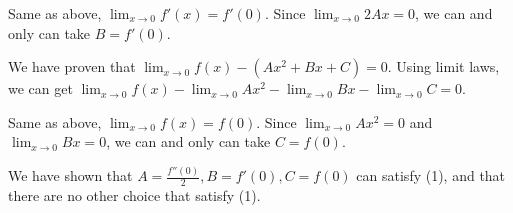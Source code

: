 \documentclass[12pt]{exam}
\newcommand{\R}{\mathbb{R}}
\begin{document}
\begin{enumerate}
\begin{enumerate}
			Same as above, $\lim_{x \to 0} f'(x) = f'(0)$. Since $\lim_{x \to 0} 2Ax = 0$, 
			we can and only can take $B = f'(0)$.

			We have proven that $\lim_{x \to 0} f(x) - (Ax^2 + Bx + C) = 0$.
			Using limit laws, we can get $\lim_{x \to 0} f(x) - \lim_{x \to 0}Ax^2 - \lim_{x \to 0}Bx - \lim_{x \to 0}C = 0$.

			Same as above, $\lim_{x \to 0} f(x) = f(0)$. Since $\lim_{x \to 0}Ax^2 = 0$ and $\lim_{x \to 0}Bx = 0$, 
			we can and only can take $C = f(0)$.

			We have shown that $A = \frac{f''(0)}{2}, B = f'(0), C = f(0)$ can satisfy (1), and that there are no other choice that satisfy (1).






			

\end{enumerate}
\end{enumerate}
\end{document}
